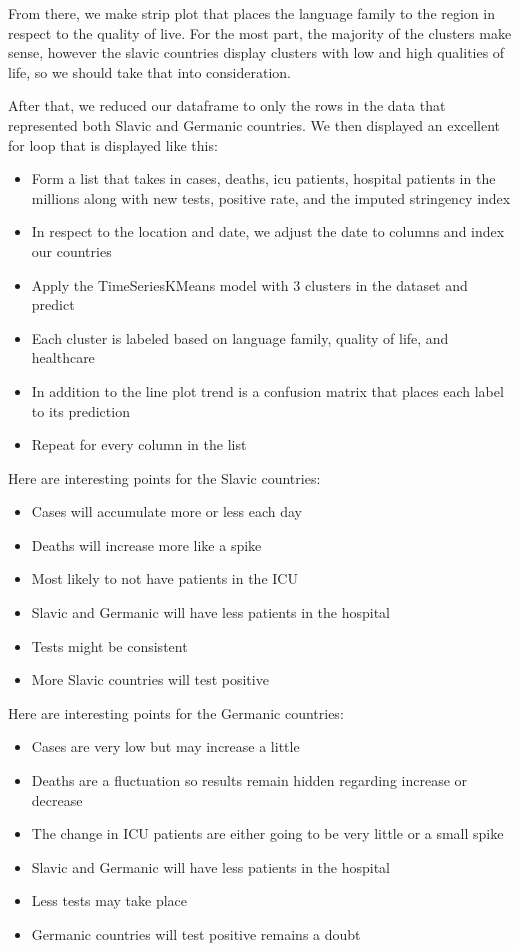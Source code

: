 \documentclass[conference]{IEEEtran}
\begin{document}
From there, we make strip plot that places the language family to the region in respect to the quality of live. For the most part, the majority of the clusters make sense, however the slavic countries display clusters with low and high qualities of life, so we should take that into consideration.

After that, we reduced our dataframe to only the rows in the data that represented both Slavic and Germanic countries. We then displayed an excellent for loop that is displayed like this:

\begin{itemize}
\item Form a list that takes in cases, deaths, icu patients, hospital patients in the millions along with new tests, positive rate, and the imputed stringency index
\item In respect to the location and date, we adjust the date to columns and index our countries
\item Apply the TimeSeriesKMeans model with 3 clusters in the dataset and predict
\item Each cluster is labeled based on language family, quality of life, and healthcare
\item In addition to the line plot trend is a confusion matrix that places each label to its prediction
\item Repeat for every column in the list
\end{itemize}

Here are interesting points for the Slavic countries:

\begin{itemize}
\item Cases will accumulate more or less each day
\item Deaths will increase more like a spike
\item Most likely to not have patients in the ICU
\item Slavic and Germanic will have less patients in the hospital
\item Tests might be consistent
\item More Slavic countries will test positive
\end{itemize}

Here are interesting points for the Germanic countries:

\begin{itemize}
\item Cases are very low but may increase a little
\item Deaths are a fluctuation so results remain hidden regarding increase or decrease
\item The change in ICU patients are either going to be very little or a small spike
\item Slavic and Germanic will have less patients in the hospital
\item Less tests may take place
\item Germanic countries will test positive remains a doubt
\end{itemize}
\end{document}
